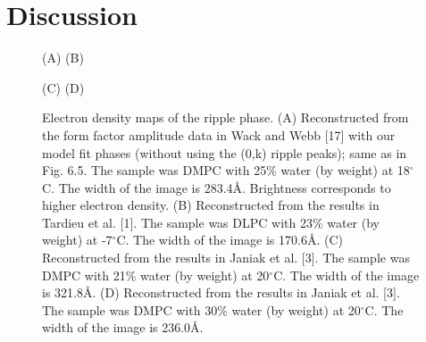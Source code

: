 \section{Discussion}

\begin{figure}
\begin{center}
\leavevmode
\raggedleft
\hspace{0.1in}
\leavevmode
\raggedright
\hspace{0.6in}
\end{center}
\vspace{-0.2in}
\hspace{1.2in} (A) \hspace{2.9in} (B)
\vspace{0.2in}
\begin{center}
\leavevmode
\raggedleft
\hspace{0.1in}
\leavevmode
\raggedright
\hspace{0.6in}
\end{center}
\vspace{-0.2in}
\hspace{1.2in} (C) \hspace{2.9in} (D)
\vspace{0.2in}
\caption{Electron density maps of the ripple phase. 
(A) Reconstructed from the form factor amplitude
data in Wack and Webb [17] with our model fit phases (without using
the (0,k) ripple peaks); same as in Fig. 6.5. The sample was
DMPC with 25\% water (by weight) at 18$^{\circ}$C. The width of the image is
283.4\AA. Brightness corresponds to higher electron density.
(B) Reconstructed
from the results in Tardieu et al. [1]. The sample was DLPC with 23\%
water (by weight) at -7$^{\circ}$C. The width of the image is 170.6\AA.
(C) Reconstructed from the results in Janiak et al. [3]. The sample was
DMPC with 21\% water (by weight) at 20$^{\circ}$C. The width of the image is
321.8\AA.
(D) Reconstructed from the results in Janiak et al. [3]. The
sample was DMPC with 30\% water (by weight) at 20$^{\circ}$C. The width
of the image is 236.0\AA. 
\label{others}}
\end{figure}

